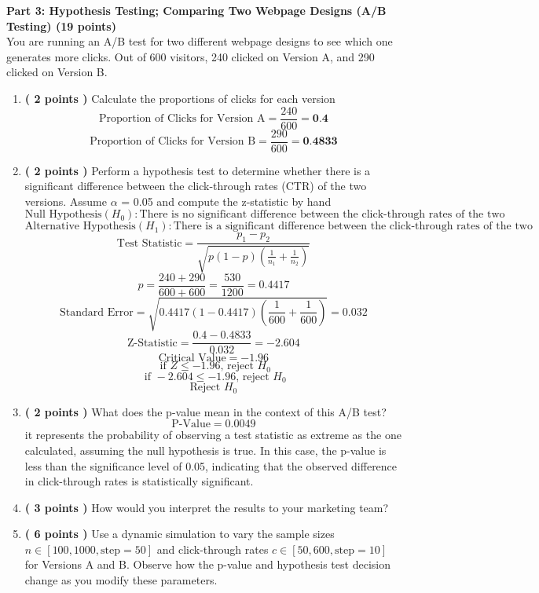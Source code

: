 \documentclass[a3paper,12pt]{extarticle} %
\begin{document}
    \subitem \textbf{Part 3: Hypothesis Testing; Comparing Two Webpage Designs (A/B Testing) (19 points)}
    \\ You are running an A/B test for two different webpage designs to see which one generates more clicks.
    Out of 600 visitors, 240 clicked on Version A, and 290 clicked on Version B.

    \begin{enumerate}
        \item \textbf{( 2 points )} Calculate the proportions of clicks for each version 
        \[
        \text{Proportion of Clicks for Version A} = \frac{240}{600} = \textbf{0.4}
        \]
        \[
        \text{Proportion of Clicks for Version B} = \frac{290}{600} = \textbf{0.4833}
        \]
        \item \textbf{( 2 points )} Perform a hypothesis test to determine whether there is a significant difference between the click-through rates (CTR) of the two versions. Assume \(\alpha\) = 0.05 and compute the z-statistic
        by hand
        \[
        \text{Null Hypothesis} (H_0): \text{There is no significant difference between the click-through rates of the two versions}
        \]
        \[
        \text{Alternative Hypothesis} (H_1): \text{There is a significant difference between the click-through rates of the two versions}
        \]
        \[
        \text{Test Statistic} = \frac{p_1 - p_2}{\sqrt{p(1-p)(\frac{1}{n_1} + \frac{1}{n_2})}}
        \]
        \[
        p = \frac{240 + 290}{600 + 600} = \frac{530}{1200} = 0.4417
        \]
        \[
        \text{Standard Error} = \sqrt{0.4417(1-0.4417)(\frac{1}{600} + \frac{1}{600})} = 0.032
        \]
        \[
        \text{Z-Statistic} = \frac{0.4 - 0.4833}{0.032} = -2.604
        \]
        \[
        \text{Critical Value} = -1.96
        \]
        \[
        \text{ if } Z \leq -1.96 \text{, reject } H_0
        \]
        \[
        \text{ if } -2.604 \leq -1.96 \text{, reject } H_0
        \]
        \[
        \text{Reject } H_0
        \]
        \item \textbf{( 2 points )} What does the p-value mean in the context of this A/B test?
        \[
        \text{P-Value} = 0.0049
        \]
        it represents the probability of observing a test statistic as extreme as the one calculated, assuming the null hypothesis is true. In this case, the p-value is less than the significance level of 0.05, indicating that the observed difference in click-through rates is statistically significant.
        \item \textbf{( 3 points )} How would you interpret the results to your marketing team?
        \item \textbf{( 6 points )} Use a dynamic simulation to vary the sample sizes \(n \in [100, 1000, \text{step}=50]\) and click-through rates \(c \in [50, 600, \text{step}=10]\) for Versions A and B. Observe how the p-value and hypothesis test decision change as you modify these parameters.
    \end{enumerate}
\end{document}
